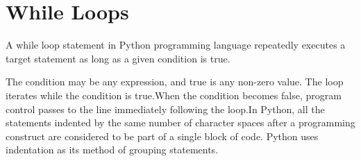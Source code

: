 \allsectionsfont{\centering \normalfont\scshape}











\section{\textbf{While Loops}}

A {\color{red}while loop} statement in Python programming language repeatedly executes a target statement as long as a given condition is true.

\vspace{1cm}
The condition may be any expression, and true is any non-zero value. The loop iterates while the condition is true.When the condition becomes false, program control passes to the line immediately following the loop.In Python, all the statements indented by the same number of character spaces after a programming construct are considered to be part of a single block of code. Python uses indentation as its method of grouping statements.

